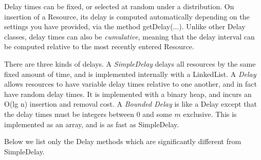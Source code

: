 \documentclass[twoside,10pt]{article}
\begin{document}
Delay times can be fixed, or selected at random under a distribution.  On insertion of a Resource, its delay is computed automatically depending on the settings you have provided, via the method getDelay(...).  Unlike other Delay classes, delay times can also be {\it cumulative}, meaning that the delay interval can be computed relative to the most recently entered Resource.

There are three kinds of delays.  A {\it SimpleDelay} delays all resources by the same fixed amount of time, and is implemented internally with a LinkedList.  A {\it Delay} allows resources to have variable delay times relative to one another, and in fact have random delay times.  It is implemented with a binary heap, and incurs an O(lg n) insertion and removal cost.  A {\it Bounded Delay} is like a Delay except that the delay times must be integers between 0 and some \(m\) exclusive.  This is implemented as an array, and is as fast as SimpleDelay.

Below we list only the Delay methods which are significantly different from SimpleDelay.
\end{document}
